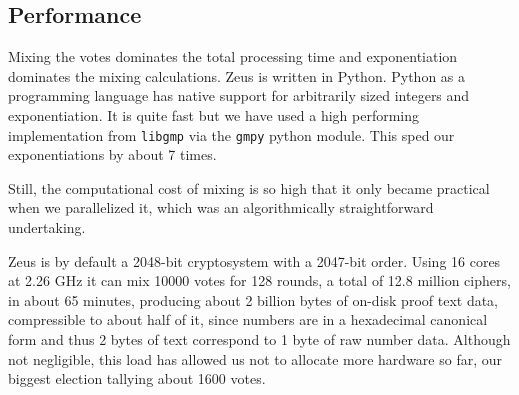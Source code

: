 \documentclass[letterpaper,10pt]{article}
\begin{document}
\subsection{Performance}
\label{sec:performance}
Mixing the votes dominates the total processing time
and exponentiation dominates the mixing calculations.
Zeus is written in Python. 
Python as a programming language has native support for arbitrarily
sized integers and exponentiation.
It is quite fast but we have used a high performing implementation
from \texttt{libgmp} via the \texttt{gmpy} python module.
This sped our exponentiations by about 7 times.

Still, the computational cost of mixing is so high that
it only became practical when we parallelized it,
which was an algorithmically straightforward undertaking.

Zeus is by default a 2048-bit cryptosystem with a 2047-bit order.
Using 16 cores at 2.26 GHz it can mix 10000 votes for 128 rounds,
a total of 12.8 million ciphers, in about 65 minutes,
producing about 2 billion bytes of on-disk proof text data,
compressible to about half of it,
since numbers are in a hexadecimal canonical form and thus
2 bytes of text correspond to 1 byte of raw number data.
Although not negligible, this load has allowed us
not to allocate more hardware so far,
our biggest election tallying about 1600 votes.

% 
% 
\end{document}
